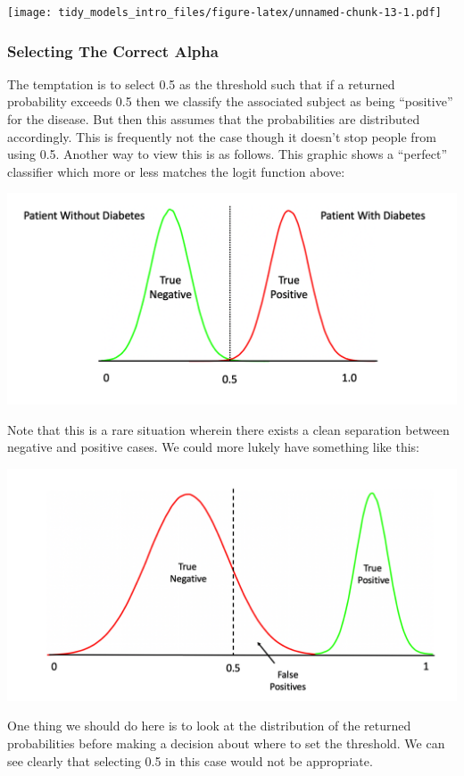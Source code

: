 \documentclass[
]{article}
\begin{document}
\texttt{[image: tidy\_models\_intro\_files/figure-latex/unnamed-chunk-13-1.pdf]}

\hypertarget{selecting-the-correct-alpha}{%
\subsubsection{Selecting The Correct
Alpha}\label{selecting-the-correct-alpha}}

The temptation is to select 0.5 as the threshold such that if a returned
probability exceeds 0.5 then we classify the associated subject as being
``positive'' for the disease. But then this assumes that the
probabilities are distributed accordingly. This is frequently not the
case though it doesn't stop people from using 0.5. Another way to view
this is as follows. This graphic shows a ``perfect'' classifier which
more or less matches the logit function above:

\includegraphics{./IMG/c1.png}

Note that this is a rare situation wherein there exists a clean
separation between negative and positive cases. We could more lukely
have something like this:

\includegraphics{./IMG/c3.png}

One thing we should do here is to look at the distribution of the
returned probabilities before making a decision about where to set the
threshold. We can see clearly that selecting 0.5 in this case would not
be appropriate.
\end{document}
